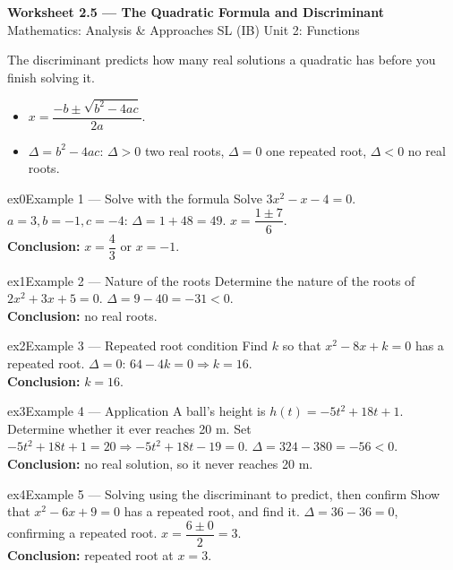 \documentclass[11pt]{article}
\begin{document}
\begin{center}
{\LARGE\bfseries\color{titleblue}Worksheet 2.5 --- The Quadratic Formula and Discriminant}\\[2pt]
{\small Mathematics: Analysis \& Approaches SL (IB) \textperiodcentered{} Unit 2: Functions}
\end{center}

\begin{ideabox}
The discriminant predicts how many real solutions a quadratic has before you finish solving it.
\begin{itemize}[leftmargin=*,itemsep=2pt]
  \item $x=\dfrac{-b\pm\sqrt{b^2-4ac}}{2a}$.
  \item $\Delta=b^2-4ac$: $\Delta>0$ two real roots, $\Delta=0$ one repeated root, $\Delta<0$ no real roots.
\end{itemize}
\end{ideabox}


\begin{example}{ex0}{Example 1 --- Solve with the formula}
Solve $3x^2-x-4=0$.\soln
$a=3,b=-1,c=-4$: $\Delta=1+48=49$. $x=\dfrac{1\pm7}{6}$.\\[3pt]\textbf{Conclusion:} $x=\dfrac43$ or $x=-1$.
\end{example}

\begin{example}{ex1}{Example 2 --- Nature of the roots}
Determine the nature of the roots of $2x^2+3x+5=0$.\soln
$\Delta=9-40=-31<0$.\\[3pt]\textbf{Conclusion:} no real roots.
\end{example}

\begin{example}{ex2}{Example 3 --- Repeated root condition}
Find $k$ so that $x^2-8x+k=0$ has a repeated root.\soln
$\Delta=0$: $64-4k=0\Rightarrow k=16$.\\[3pt]\textbf{Conclusion:} $k=16$.
\end{example}

\begin{example}{ex3}{Example 4 --- Application}
A ball's height is $h(t)=-5t^2+18t+1$. Determine whether it ever reaches 20 m.\soln
Set $-5t^2+18t+1=20\Rightarrow-5t^2+18t-19=0$. $\Delta=324-380=-56<0$.\\[3pt]\textbf{Conclusion:} no real solution, so it never reaches 20 m.
\end{example}

\begin{example}{ex4}{Example 5 --- Solving using the discriminant to predict, then confirm}
Show that $x^2-6x+9=0$ has a repeated root, and find it.\soln
$\Delta=36-36=0$, confirming a repeated root. $x=\dfrac{6\pm0}{2}=3$.\\[3pt]\textbf{Conclusion:} repeated root at $x=3$.
\end{example}
\end{document}
